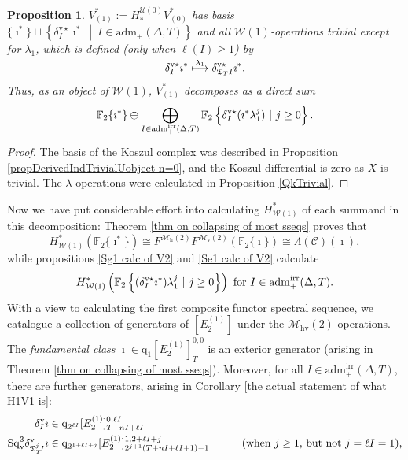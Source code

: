 \documentclass[11pt]{amsart} \renewcommand{\baselinestretch}{1.4}
\theoremstyle{plain}
\newtheorem{prop}[thm]{Proposition}
\theoremstyle{definition}
\newcommand{\scrC}{\mathscr{C}}
\newcommand{\calU}{\mathcal{U}}
\newcommand{\calw}{\mathcal{W}}
\newcommand{\calmv}{\mathcal{M}\dver}
\newcommand{\calmh}{\mathcal{M}\dhor}
\newcommand{\calMhv}{\mathcal{M}_\mathrm{hv}}
\newcommand{\CommOperad}{{\scrC}}
\newcommand{\quadgrad}[1]{\mathrm{q}_{#1}}
\newcommand{\aDT}{\mathrm{adm}_+(\Delta,T)}
\newcommand{\aDTirr}{\mathrm{adm}_+^\mathrm{irr}(\Delta,T)}
\newcommand{\F}{\mathbb{F}}
\newcommand{\Ftwo}{\F_2}
\newcommand{\TOP}{\mathfrak{T}}
\newcommand{\E}[5]{[E^{#1}_{#2}#3]^{#4}_{#5}}
\newcommand{\uver}{^\mathrm{v}}
\newcommand{\dver}{_\mathrm{v}}
\newcommand{\dhor}{_\mathrm{h}}
\newcommand{\Sqv}{\mathrm{Sq}\dver}
\newcommand{\deltav}{\delta\uver}
\newcommand{\deltavstar}{\delta^{\mathrm{v}\star}}
\begin{document}
\begin{Calculations of HWn for n nonzero}
\begin{prop}
\label{calc of V1 from W0 sphere}
$V^*_{(1)}:=H_*^{\calU(0)}V^*_{(0)}$ has basis $\{\imath^*\}\sqcup\left\{\deltavstar_I\imath^*\ \middle|\ I\in\aDT\right\}$ and all $\calw(1)$-operations trivial except for $\lambda_1$, which is defined (only when $\ell(I)\geq1$) by
\[\deltavstar_I\imath^*\overset{\smash{\lambda_1}}{\longmapsto }\deltavstar_{\TOP_T I}\imath^*.\]
Thus, as an object of $\calw(1)$, $V^*_{(1)}$ decomposes as a direct sum
\[\Ftwo \{\imath^*\}\oplus\bigoplus_{\smash{I\in \aDTirr}}\Ftwo \left\{\deltavstar_I(\imath^*\lambda_1^j)\ |\ j\geq0\right\}.\]
\end{prop}
\begin{proof}
The basis of the Koszul complex was described in Proposition \ref{propDerivedIndTrivialUobject n=0}, and the Koszul differential is zero as $X$ is trivial. The $\lambda$-operations were calculated in Proposition \ref{QkTrivial}.
\end{proof}
Now we have put considerable effort into calculating $H^*_{\calw(1)}$ of each summand in this decomposition: Theorem \ref{thm on collapsing of most sseqs} proves that
\[H^*_{\calw(1)}(\Ftwo \{\imath^*\})\cong F^{\calmh(2)}F^{\calmv(2)}(\Ftwo \{\imath\})\cong \Lambda(\CommOperad)(\imath),\]
while propositions \ref{Sg1 calc of V2} and \ref{Se1 calc of V2} calculate
\[H^*_{\calw(1)}\left(\Ftwo \left\{(\deltavstar_I\imath^*)\lambda_1^j\ |\ j\geq0\right\}\right)\textup{ for $I\in\aDTirr$.}\]
With a view to calculating the first composite functor spectral sequence,
we catalogue a collection of generators of $\E{(1)}{2}{}{}{}$ under the $\calMhv(2)$-operations. The \emph{fundamental class} $\imath\in 
\quadgrad{1}\E{(1)}{2}{}{0,0}{T}$ is an exterior generator (arising in Theorem \ref{thm on collapsing of most sseqs}). %
Moreover, for all $I\in\aDTirr$, there are further generators, arising in Corollary \ref{the actual statement of what H1V1 is}:
\begin{alignat}{2}
\label{first generator}\deltav_I\imath&\in \quadgrad{2^{\ell I}}\E{(1)}{2}{}{0,\ell I}{T+nI+\ell I}&\qquad&\\
\Sqv^{3}\deltav_{\TOP_T^j\!I}\imath&\in 
\quadgrad{2^{1+\ell I+j}}\E{(1)}{2}{}{1,2+\ell I+j}{2^{j+1}(T+nI+\ell I+1)-1}
&\qquad&\textup{(when $j\geq1$, but not $j=\ell I=1$),}\\

\end{alignat}
\end{Calculations of HWn for n nonzero}
\end{document}
